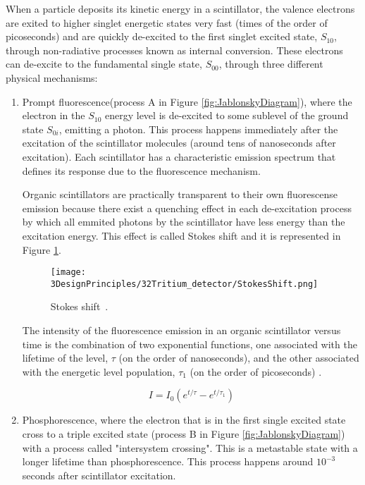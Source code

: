 When a particle deposits its kinetic energy in a scintillator, the valence electrons are exited to higher singlet energetic states very fast (times of the order of picoseconds) and are quickly de-excited to the first singlet excited state, $S_{10}$, through non-radiative processes known as internal conversion. These electrons can de-excite to the fundamental single state, $S_{00}$, through three different physical mechanisms:

\begin{enumerate}

\item{} Prompt fluorescence(process A in Figure \ref{fig:JablonskyDiagram}), where the electron in the $S_{10}$ energy level  is de-excited to some sublevel of the ground state $S_{0i}$, emitting a photon. This process happens immediately after the excitation of the scintillator molecules (around tens of nanoseconds after excitation). Each scintillator has a characteristic emission spectrum that defines its response due to the fluorescence mechanism. 

Organic scintillators are practically transparent to their own fluorescense emission because there exist a quenching effect in each de-excitation process by which all emmited  photons by the scintillator have less energy than the excitation energy. This effect is called Stokes shift and it is represented in Figure \ref{fig:StokesShift}.

\begin{figure}[htbp]
\centering
\texttt{[image: 3DesignPrinciples/32Tritium\_detector/StokesShift.png]}
\caption{Stokes shift\label{fig:StokesShift}~\cite{Knoll}.}
\end{figure}

The intensity of the fluorescence emission in an organic scintillator versus time is the combination of two exponential functions, one associated with the lifetime of the level, $\tau$ (on the order of nanoseconds), and the other associated with the energetic level population, $\tau_1$ (on the order of picoseconds) \cite{Knoll}.

\begin{equation}
I=I_0\left(e^{t/\tau} - e^{t/\tau_1}\right) 
\label{eq:IntensityTimeScintillator}
\end{equation}

\item{} Phosphorescence, where the electron that is in the first single excited state cross to a triple excited state (process B in Figure \ref{fig:JablonskyDiagram}) with a process called "intersystem crossing". This is a metastable state with a longer lifetime than phosphorescence. This process happens around $10^{-3}$ seconds after scintillator excitation.


\end{enumerate}
